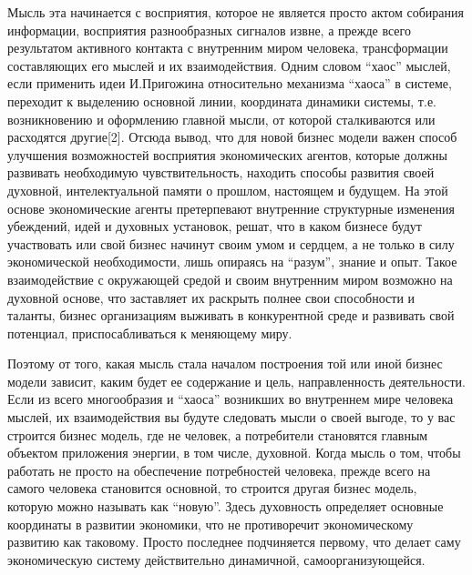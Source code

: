 Мысль эта начинается с восприятия, которое не является просто актом
собирания информации, восприятия разнообразных сигналов извне, а прежде
всего результатом активного контакта с внутренним миром человека,
трансформации составляющих его мыслей и их взаимодействия. Одним словом
``хаос'' мыслей, если применить идеи И.Пригожина относительно механизма
``хаоса'' в системе, переходит к выделению основной линии, координата
динамики системы, т.е. возникновению и оформлению главной мысли, от
которой сталкиваются или расходятся другие{[}2{]}. Отсюда вывод, что для
новой бизнес модели важен способ улучшения возможностей восприятия
экономических агентов, которые должны развивать необходимую
чувствительность, находить способы развития своей духовной,
интелектуальной памяти о прошлом, настоящем и будущем. На этой основе
экономические агенты претерпевают внутренние структурные изменения
убеждений, идей и духовных установок, решат, что в каком бизнесе будут
участвовать или свой бизнес начинут своим умом и сердцем, а не только в
силу экономической необходимости, лишь опираясь на ``разум'', знание и
опыт. Такое взаимодействие с окружающей средой и своим внутренним миром
возможно на духовной основе, что заставляет их раскрыть полнее свои
способности и таланты, бизнес организациям выживать в конкурентной среде
и развивать свой потенциал, приспосабливаться к меняющему миру.

Поэтому от того, какая мысль стала началом построения той или иной
бизнес модели зависит, каким будет ее содержание и цель, направленность
деятельности. Если из всего многообразия и ``хаоса'' возникших во
внутреннем мире человека мыслей, их взаимодействия вы будуте следовать
мысли о своей выгоде, то у вас строится бизнес модель, где не человек, а
потребители становятся главным объектом приложения энергии, в том числе,
духовной. Когда мысль о том, чтобы работать не просто на обеспечение
потребностей человека, прежде всего на самого человека становится
основной, то строится другая бизнес модель, которую можно называть как
``новую''. Здесь духовность определяет основные координаты в развитии
экономики, что не противоречит экономическому развитию как таковому.
Просто последнее подчиняется первому, что делает саму экономическую
систему действительно динамичной, самоорганизующейся.

